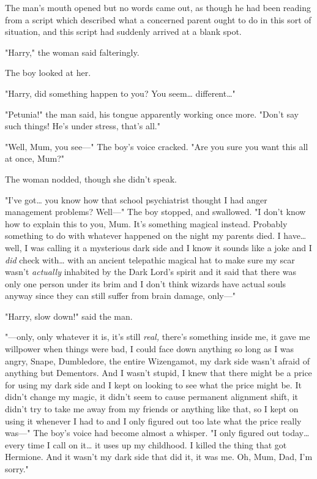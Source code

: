 The man's mouth opened but no words came out, as though he had been reading 
from a script which described what a concerned parent ought to do in this sort 
of situation, and this script had suddenly arrived at a blank spot.

"Harry," the woman said falteringly.

The boy looked at her.

"Harry, did something happen to you? You seem{\ldots} different{\ldots}"

"Petunia!" the man said, his tongue apparently working once more. "Don't say 
such things! He's under stress, that's all."

"Well, Mum, you see---" The boy's voice cracked. "Are you sure you want this 
all at once, Mum?"

The woman nodded, though she didn't speak.

"I've got{\ldots} you know how that school psychiatrist thought I had anger 
management problems? Well---" The boy stopped, and swallowed. "I don't know how 
to explain this to you, Mum. It's something magical instead. Probably something 
to do with whatever happened on the night my parents died. I have{\ldots} well, 
I was calling it a mysterious dark side and I know it sounds like a joke and I 
\emph{did} check with{\ldots} with an ancient telepathic magical hat to make 
sure my scar wasn't \emph{actually} inhabited by the Dark Lord's spirit and it 
said that there was only one person under its brim and I don't think wizards 
have actual souls anyway since they can still suffer from brain damage, only---"

"Harry, slow down!" said the man.

"---only, only whatever it is, it's still \emph{real,} there's something inside 
me, it gave me willpower when things were bad, I could face down anything so 
long as I was angry, Snape, Dumbledore, the entire Wizengamot, my dark side 
wasn't afraid of anything but Dementors. And I wasn't stupid, I knew that there 
might be a price for using my dark side and I kept on looking to see what the 
price might be. It didn't change my magic, it didn't seem to cause permanent 
alignment shift, it didn't try to take me away from my friends or anything like 
that, so I kept on using it whenever I had to and I only figured out too late 
what the price really was---" The boy's voice had become almost a whisper. "I 
only figured out today{\ldots} every time I call on it{\ldots} it uses up my 
childhood. I killed the thing that got Hermione. And it wasn't my dark side 
that did it, it was me. Oh, Mum, Dad, I'm sorry."


